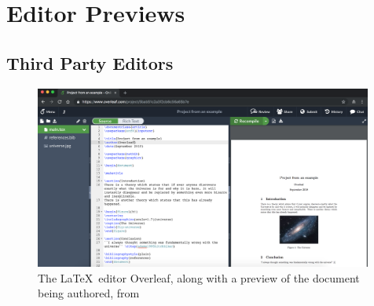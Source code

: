 \chapter{Editor Previews}\label{ch:editor-previews}

\section{Third Party Editors}\label{sec:third-partty-editors}

\begin{figure}[h]
    \centering
    \includegraphics[width=0.99\textwidth]{figures/overleafEditor}
    \caption{The \LaTeX \ editor Overleaf, along with a preview of the document being authored, from~\cite{overleafDocs}}
    \label{fig:overleafPreview}
\end{figure}

